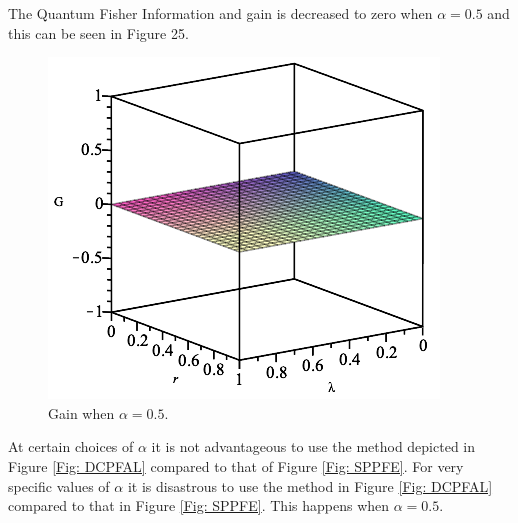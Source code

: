\documentclass[twocolumn]{article}
\begin{document}
\par \noindent
The Quantum Fisher Information and gain is decreased to zero when $\alpha=0.5$ and this can be seen in Figure 25.
\newpage
\begin{figure}[ht]
    \centering
    \includegraphics[scale=0.55]{Phase-Flip-Two-Channel-Alpha=05-Gain.png}
    \caption{\footnotesize{Gain when $\alpha=0.5$.}}
    \label{Fig: DCPFA05G}
\end{figure}
\par \noindent
At certain choices of $\alpha$ it is not advantageous to use the method depicted in Figure \ref{Fig: DCPFAL} compared to that of Figure \ref{Fig: SPPFE}. For very specific values of $\alpha$ it is disastrous to use the method in Figure \ref{Fig: DCPFAL} compared to that in Figure \ref{Fig: SPPFE}. This happens when $\alpha=0.5$. 
\end{document}

